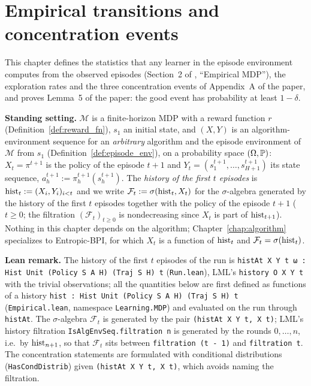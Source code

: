 \chapter{Empirical transitions and concentration events}
\label{chap:empirical}

This chapter defines the statistics that any learner in the episode environment computes from
the observed episodes (Section~2 of \cite{essakine2026tight}, ``Empirical MDP''), the
exploration rates and the three concentration events of Appendix~A of the paper, and proves
Lemma~5 of the paper: the good event has probability at least $1 - \delta$.

\textbf{Standing setting.} $\mathcal M$ is a finite-horizon MDP with a reward function $r$
(Definition~\ref{def:reward_fn}), $s_1$ an initial state, and $(X, Y)$ is an
algorithm-environment sequence for an \emph{arbitrary} algorithm and the episode environment of
$\mathcal M$ from $s_1$ (Definition~\ref{def:episode_env}), on a probability space
$(\Omega, \mathbb{P})$: $X_t = \pi^{t+1}$ is the policy of the episode $t + 1$ and
$Y_t = (s^{t+1}_1, \dots, s^{t+1}_{H+1})$ its state sequence, $a^{t+1}_h := \pi^{t+1}_h(s^{t+1}_h)$.
The \emph{history of the first $t$ episodes} is $\mathrm{hist}_t := (X_i, Y_i)_{i < t}$ and we write
$\mathcal F_t := \sigma(\mathrm{hist}_t, X_t)$ for the $\sigma$-algebra generated by the history of the
first $t$ episodes together with the policy of the episode $t + 1$ ($t \ge 0$; the filtration
$(\mathcal F_t)_{t \ge 0}$ is nondecreasing since $X_t$ is part of $\mathrm{hist}_{t+1}$). Nothing in this
chapter depends on the algorithm; Chapter~\ref{chap:algorithm} specializes to Entropic-BPI,
for which $X_t$ is a function of $\mathrm{hist}_t$ and $\mathcal F_t = \sigma(\mathrm{hist}_t)$.

\textbf{Lean remark.} The history of the first $t$ episodes of the run is
\texttt{histAt X Y t ω : Hist Unit (Policy S A H) (Traj S H) t} (\texttt{Run.lean}), LML's
\texttt{history O X Y t} with the trivial observations; all the quantities below are first
defined as functions of a history \texttt{hist : Hist Unit (Policy S A H) (Traj S H) t}
(\texttt{Empirical.lean}, namespace \texttt{Learning.MDP}) and evaluated on the run through
\texttt{histAt}. The $\sigma$-algebra $\mathcal F_t$ is generated by the pair
\texttt{(histAt X Y t, X t)}; LML's history filtration \texttt{IsAlgEnvSeq.filtration n} is
generated by the rounds $0, \dots, n$, i.e.\ by $\mathrm{hist}_{n+1}$, so that $\mathcal F_t$ sits between
\texttt{filtration (t - 1)} and \texttt{filtration t}. The concentration statements are
formulated with conditional distributions (\texttt{HasCondDistrib}) given
\texttt{(histAt X Y t, X t)}, which avoids naming the filtration.

